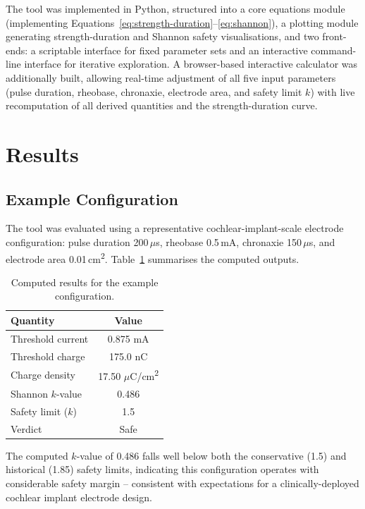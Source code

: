 \documentclass[conference]{IEEEtran}
\begin{document}
The tool was implemented in Python, structured into a core equations module (implementing Equations~\ref{eq:strength-duration}--\ref{eq:shannon}), a plotting module generating strength-duration and Shannon safety visualisations, and two front-ends: a scriptable interface for fixed parameter sets and an interactive command-line interface for iterative exploration. A browser-based interactive calculator was additionally built, allowing real-time adjustment of all five input parameters (pulse duration, rheobase, chronaxie, electrode area, and safety limit $k$) with live recomputation of all derived quantities and the strength-duration curve.

\section{Results}

\subsection{Example Configuration}

The tool was evaluated using a representative cochlear-implant-scale electrode configuration: pulse duration 200\,$\mu$s, rheobase 0.5\,mA, chronaxie 150\,$\mu$s, and electrode area 0.01\,cm\textsuperscript{2}. Table~\ref{tab:results} summarises the computed outputs.

\begin{table}[!ht]
\centering
\caption{Computed results for the example configuration.}
\label{tab:results}
\begin{tabular}{@{}lc@{}}
\toprule
Quantity & Value \\
\midrule
Threshold current & 0.875 mA \\
Threshold charge & 175.0 nC \\
Charge density & 17.50 $\mu$C/cm\textsuperscript{2} \\
Shannon $k$-value & 0.486 \\
Safety limit ($k$) & 1.5 \\
Verdict & Safe \\
\bottomrule
\end{tabular}
\end{table}

The computed $k$-value of 0.486 falls well below both the conservative (1.5) and historical (1.85) safety limits, indicating this configuration operates with considerable safety margin -- consistent with expectations for a clinically-deployed cochlear implant electrode design.
\end{document}
